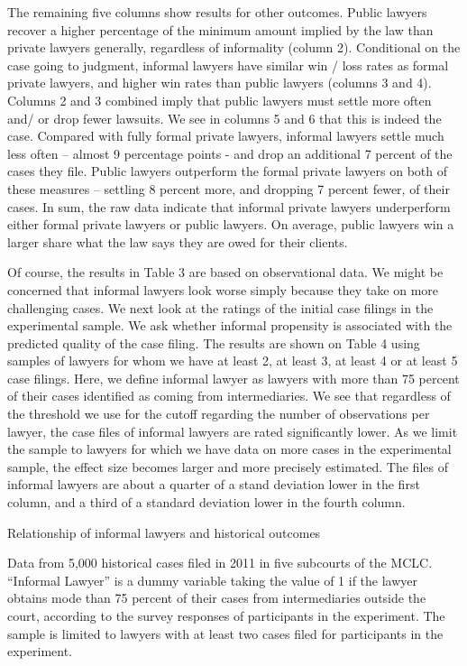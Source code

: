 \documentclass[oneside,12pt]{article}
\begin{document}
The remaining five columns show results for other outcomes. Public lawyers recover a higher percentage of the minimum amount implied by the law than private lawyers generally, regardless of informality (column 2). Conditional on the case going to judgment, informal lawyers have similar win / loss rates as formal private lawyers, and higher win rates than public lawyers (columns 3 and 4). Columns 2 and 3 combined imply that public lawyers must settle more often and/ or drop fewer lawsuits. We see in columns 5 and 6 that this is indeed the case. Compared with fully formal private lawyers, informal lawyers settle much less often – almost 9 percentage points - and drop an additional 7 percent of the cases they file. Public lawyers outperform the formal private lawyers on both of these measures – settling 8 percent more, and dropping 7 percent fewer, of their cases. In sum, the raw data indicate that informal private lawyers underperform either formal private lawyers or public lawyers. On average, public lawyers win a larger share what the law says they are owed for their clients. 

Of course, the results in Table 3 are based on observational data. We might be concerned that informal lawyers look worse simply because they take on more challenging cases. We next look at the ratings of the initial case filings in the experimental sample. We ask whether informal propensity is associated with the predicted quality of the case filing. The results are shown on Table 4 using samples of lawyers for whom we have at least 2, at least 3, at least 4 or at least 5 case filings. Here, we define informal lawyer as lawyers with more than 75 percent of their cases identified as coming from intermediaries. We see that regardless of the threshold we use for the cutoff regarding the number of observations per lawyer, the case files of informal lawyers are rated significantly lower. As we limit the sample to lawyers for which we have data on more cases in the experimental sample, the effect size becomes larger and more precisely estimated. The files of informal lawyers are about a quarter of a stand deviation lower in the first column, and a third of a standard deviation lower in the fourth column. 


\begin{landscape}
\begin{table}[!ht]
    \caption{Relationship of informal lawyers and historical outcomes} %
    \label{tab:3}
    \center
    \notesize{}
    \begin{figurenotes}
    Data from 5,000 historical cases filed in 2011 in five subcourts of the MCLC. “Informal Lawyer” is a dummy variable taking the value of 1 if the lawyer obtains mode than 75 percent of their cases from intermediaries outside the court, according to the survey responses of participants in the experiment. The sample is limited to lawyers with at least two cases filed for participants in the experiment.
    \end{figurenotes}
  
\end{table}
\end{landscape}
\end{document}
